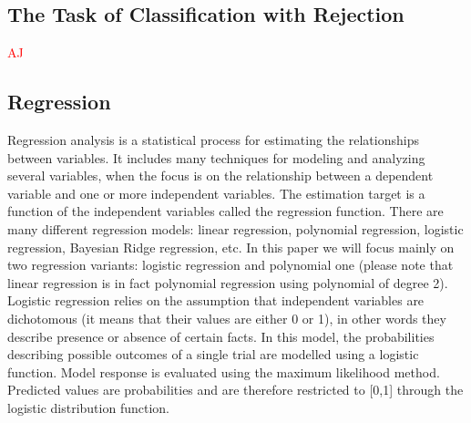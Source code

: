 \documentclass{llncs}
\begin{document}
\subsection{The Task of Classification with Rejection}
\textcolor{red} {AJ}


\subsection{Regression}
Regression analysis is a statistical process for estimating the relationships between variables. It includes many techniques for modeling and analyzing several variables, when the focus is on the relationship between a dependent variable and one or more independent variables. The estimation target is a function of the independent variables called the regression function. There are many different regression models: linear regression, polynomial regression, logistic regression, Bayesian Ridge regression, etc. In this paper we will focus mainly on two regression variants: logistic regression and polynomial one (please note that linear regression is in fact polynomial regression using polynomial of degree 2). \\

Logistic regression relies on the assumption that independent variables are dichotomous (it means that their values are either 0 or 1), in other words they describe presence or absence of certain facts. In this model, the probabilities describing possible outcomes of a single trial are modelled using a logistic function. Model response is evaluated using the maximum likelihood method. Predicted values are probabilities and are therefore restricted to [0,1] through the logistic distribution function. \\ %
\end{document}
